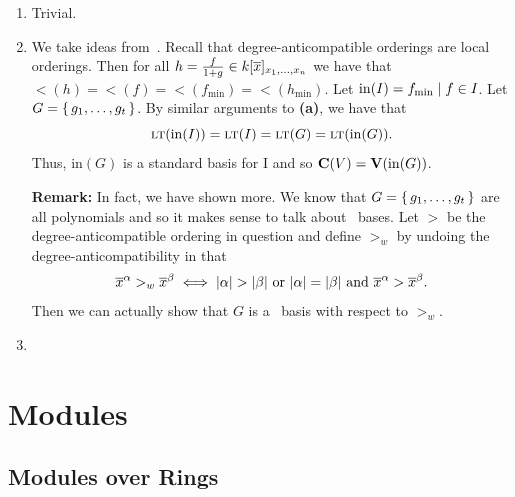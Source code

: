 \documentclass[letterpaper, 11pt, oneside]{book}
\begin{document}
\begin{sol}\label{ex:UAG_4.5.5}
  \begin{enumerate}
    \item Trivial.
    \item We take ideas from~\cite[Proposition 4]{Mora1989}.
          Recall that degree-anticompatible orderings are local orderings.
          Then for all $h = \frac{f}{1 + g} \in k[\overline{x}]_{\ideal{x_{1}, \ldots, x_{n}}}$ we have that $\lt(h) = \lt(f) = \lt(f_{\min}) = \lt(h_{\min})$.
          Let $\mathrm{in}(I) = \ideal{f_{\min} \mid f \in I}$.
          Let $G = \set{g_{1}, \ldots, g_{t}}$.
          By similar arguments to \textbf{(a)}, we have that
          \[
            \ideal{\lt(\mathrm{in}(I))} = \ideal{\lt(I)} = \ideal{\lt(G)} = \ideal{\lt(\mathrm{in}(G))}.
          \]
          Thus, $\mathrm{in}(G)$ is a standard basis for $\mathrm{I}$ and so $\mathbf{C}(V) = \operatorname{\mathbf{V}}(\mathrm{in}(G))$.

          \textbf{Remark:} In fact, we have shown more.
          We know that $G = \set{g_{1}, \ldots, g_{t}}$ are all polynomials and so it makes sense to talk about \Grobner\ bases.
          Let $>$ be the degree-anticompatible ordering in question and define $>_{w}$ by undoing the degree-anticompatibility in that
          \[
            \overline{x}^{\alpha} >_{w} \overline{x}^{\beta} \iff \abs{\alpha} > \abs{\beta} \text{ or } \abs{\alpha} = \abs{\beta} \text{ and } \overline{x}^{\alpha} > \overline{x}^{\beta}.
          \]
          Then we can actually show that $G$ is a \Grobner\ basis with respect to $>_{w}$.
    \item {}
  \end{enumerate}
\end{sol}

\chapter{Modules}

\section{Modules over Rings}

\end{document}
